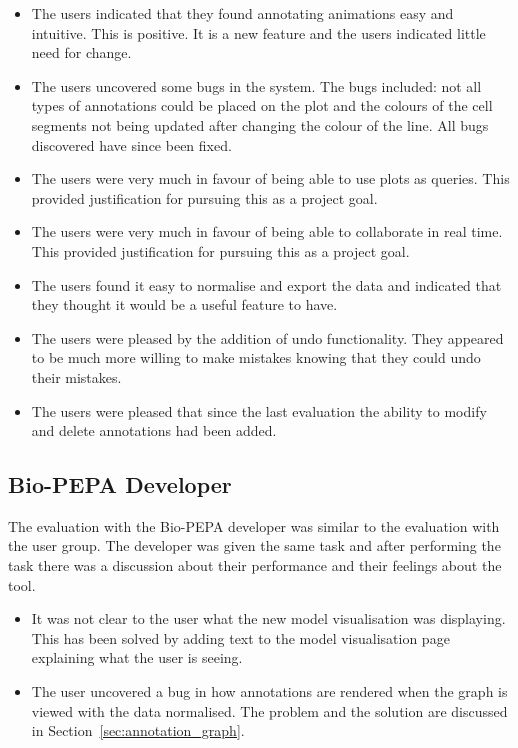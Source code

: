 \begin{itemize}
\item The users indicated that they found annotating animations easy and intuitive.  This is positive.  It is a new feature and the users indicated little need for change.
\item The users uncovered some bugs in the system.  The bugs included: not all types of annotations could be placed on the plot and the colours of the cell segments not being updated after changing the colour of the line.  All bugs discovered have since been fixed.
\item The users were very much in favour of being able to use plots as queries.  This provided justification for pursuing this as a project goal.
\item The users were very much in favour of being able to collaborate in real time. This provided justification for pursuing this as a project goal.
\item The users found it easy to normalise and export the data and indicated that they thought it would be a useful feature to have.
\item The users were pleased by the addition of undo functionality.  They appeared to be much more willing to make mistakes knowing that they could undo their mistakes.
\item The users were pleased that since the last evaluation the ability to modify and delete annotations had been added.
\end{itemize}

\subsection{Bio-PEPA Developer}

The evaluation with the Bio-PEPA developer was similar to the evaluation with the user group.  The developer was given the same task and after performing the task there was a discussion about their performance and their feelings about the tool.

\begin{itemize}
\item It was not clear to the user what the new model visualisation was displaying.  This has been solved by adding text to the model visualisation page explaining what the user is seeing.
\item The user uncovered a bug in how annotations are rendered when the graph is viewed with the data normalised.  The problem and the solution are discussed in Section~\ref{sec:annotation_graph}.
\end{itemize}

